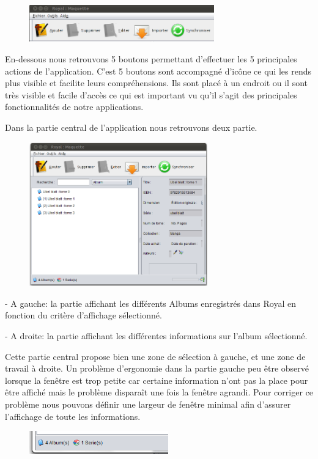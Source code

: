 \documentclass[etudiants]{support-iutrs}
\begin{document}
\begin{figure}
\includegraphics[width=8cm]{img/app_pc_maquette_btn.png}
\end{figure}

En-dessous nous retrouvons 5 boutons permettant d'effectuer les 5 principales actions de l'application. 
C'est 5 boutons sont accompagné d’icône ce qui les rends plus visible et facilite leurs compréhensions.
Ils sont placé à un endroit ou il sont très visible et facile d'accès ce qui est important vu qu'il s'agit des principales fonctionnalités de notre applications.

Dans la partie central de l'application nous retrouvons deux partie.

\begin{figure}
\includegraphics[width=7.7cm]{img/app_pc_maquette2.png}
\end{figure}
- A gauche: la partie affichant les différents Albums enregistrés dans Royal en fonction du critère d'affichage sélectionné. 

- A droite: la partie affichant les différentes informations sur l'album sélectionné.

Cette partie central propose bien une zone de sélection à gauche, et une zone de travail à droite.
Un problème d'ergonomie dans la partie gauche peu être observé lorsque la fenêtre est trop petite car certaine information n'ont pas la place pour être affiché mais le problème disparaît une fois la fenêtre agrandi. 
Pour corriger ce problème nous pouvons définir une largeur de fenêtre minimal afin d'assurer l’affichage de toute les informations. 

\begin{figure}
\includegraphics[width=6cm]{img/app_pc_maquette_bas.png}
\end{figure}
\end{document}

